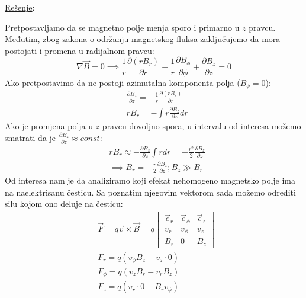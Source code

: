 \documentclass[fleqn]{report}
\begin{document}
\begin{enumerate}
          \underline{Rešenje}:

          Pretpostavljamo da se magnetno polje menja sporo i primarno u $z$ pravcu.
          Međutim, zbog zakona o održanju magnetskog fluksa zaključujemo da mora postojati i promena u radijalnom pravcu:
          \[ \nabla \vec{B} = 0 \implies \frac{1}{r}\frac{\partial(rB_r)}{\partial r} + \frac{1}{r}\frac{\partial B_\phi}{\partial\phi} + \frac{\partial B_z}{\partial z} = 0 \]
          Ako pretpostavimo da ne postoji azimutalna komponenta polja ($B_\phi = 0$):
          \begin{align*}
               & \frac{\partial B_z}{\partial z} = -\frac{1}{r}\frac{\partial (rB_r)}{\partial r} \\
               & rB_r = -\int r\frac{\partial B_z}{\partial z}dr
          \end{align*}
          Ako je promjena polja u $z$ pravcu dovoljno spora, u intervalu od interesa možemo smatrati da je $\frac{\partial B_z}{\partial z} \approx const$:
          \begin{align*}
               & rB_r \approx -\frac{\partial B_z}{\partial z} \int rdr = -\frac{r^2}{2} \frac{\partial B_z}{\partial z} \\
               & \implies B_r = -\frac{r}{2}\frac{\partial B_z}{\partial z}; B_z \gg B_r
          \end{align*}
          Od interesa nam je da analiziramo koji efekat nehomogeno magnetsko polje ima na naelektrisanu česticu.
          Sa poznatim njegovim vektorom sada možemo odrediti silu kojom ono deluje na česticu:
          \begin{align*}
               & \vec F = q \vec v \times \vec B = q \begin{vmatrix}
                                                         \vec e_r & \vec e_\phi & \vec e_z \\
                                                         v_r      & v_\phi      & v_z      \\
                                                         B_r      & 0           & B_z
                                                     \end{vmatrix} \\
               & F_r = q(v_\phi B_z - v_z \cdot 0)                                         \\
               & F_\phi = q(v_z B_r - v_r B_z)                                             \\
               & F_z = q(v_r \cdot 0 - B_r v_\phi)

\end{align*}
\end{enumerate}
\end{document}
